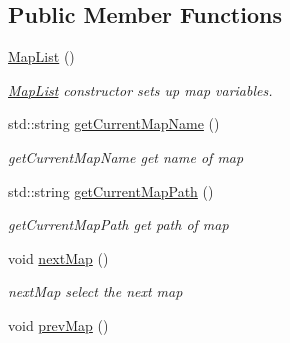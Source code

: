 \subsection*{Public Member Functions}
\begin{DoxyCompactItemize}
\item 
\hypertarget{class_map_list_a3795f50e60e97ae83fee956fb05abc7b}{}\hyperlink{class_map_list_a3795f50e60e97ae83fee956fb05abc7b}{Map\+List} ()\label{class_map_list_a3795f50e60e97ae83fee956fb05abc7b}

\begin{DoxyCompactList}\small\item\em \hyperlink{class_map_list}{Map\+List} constructor sets up map variables. \end{DoxyCompactList}\item 
std\+::string \hyperlink{class_map_list_ace60b9235b87ef67a3704dd5ace66163}{get\+Current\+Map\+Name} ()
\begin{DoxyCompactList}\small\item\em get\+Current\+Map\+Name get name of map \end{DoxyCompactList}\item 
std\+::string \hyperlink{class_map_list_a426efbb1d6e753aeeaa261daad0c47ae}{get\+Current\+Map\+Path} ()
\begin{DoxyCompactList}\small\item\em get\+Current\+Map\+Path get path of map \end{DoxyCompactList}\item 
\hypertarget{class_map_list_a0abdd1e7d0a4723ef1f69bbb339eaed5}{}void \hyperlink{class_map_list_a0abdd1e7d0a4723ef1f69bbb339eaed5}{next\+Map} ()\label{class_map_list_a0abdd1e7d0a4723ef1f69bbb339eaed5}

\begin{DoxyCompactList}\small\item\em next\+Map select the next map \end{DoxyCompactList}\item 
\hypertarget{class_map_list_a54758497d92c267e0ed998c65caef07f}{}void \hyperlink{class_map_list_a54758497d92c267e0ed998c65caef07f}{prev\+Map} ()\label{class_map_list_a54758497d92c267e0ed998c65caef07f}


\end{DoxyCompactItemize}

